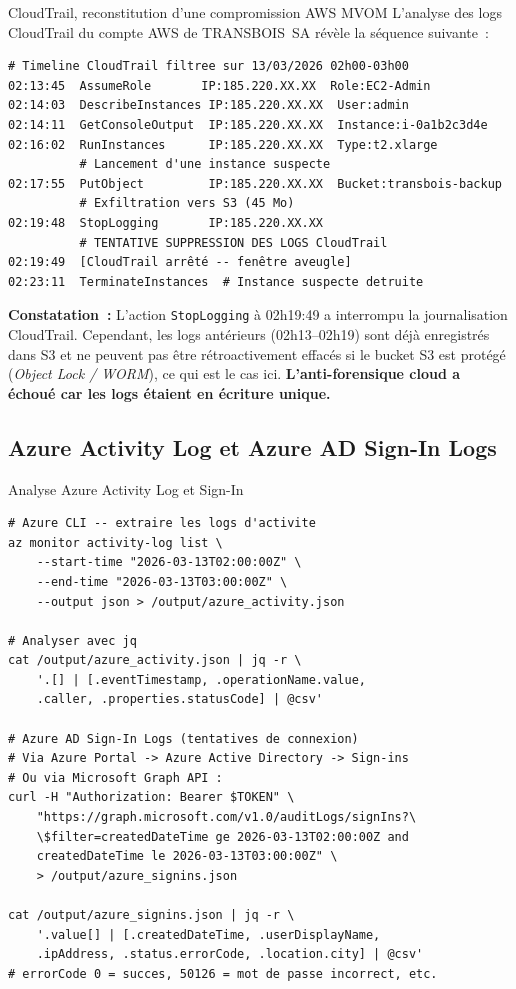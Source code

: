 \begin{boxscenario}{CloudTrail, reconstitution d'une compromission AWS MVOM}
L'analyse des logs CloudTrail du compte AWS de TRANSBOIS~SA révèle
la séquence suivante~:

\begin{lstlisting}[language=bash_forensique]
# Timeline CloudTrail filtree sur 13/03/2026 02h00-03h00
02:13:45  AssumeRole       IP:185.220.XX.XX  Role:EC2-Admin
02:14:03  DescribeInstances IP:185.220.XX.XX  User:admin
02:14:11  GetConsoleOutput  IP:185.220.XX.XX  Instance:i-0a1b2c3d4e
02:16:02  RunInstances      IP:185.220.XX.XX  Type:t2.xlarge
          # Lancement d'une instance suspecte
02:17:55  PutObject         IP:185.220.XX.XX  Bucket:transbois-backup
          # Exfiltration vers S3 (45 Mo)
02:19:48  StopLogging       IP:185.220.XX.XX
          # TENTATIVE SUPPRESSION DES LOGS CloudTrail
02:19:49  [CloudTrail arrêté -- fenêtre aveugle]
02:23:11  TerminateInstances  # Instance suspecte detruite
\end{lstlisting}

\textbf{Constatation~:} L'action \texttt{StopLogging} à 02h19:49 a
interrompu la journalisation CloudTrail. Cependant, les logs antérieurs
(02h13--02h19) sont déjà enregistrés dans S3 et ne peuvent pas être
rétroactivement effacés si le bucket S3 est protégé
(\textit{Object Lock / WORM}), ce qui est le cas ici.
\textbf{L'anti-forensique cloud a échoué car les logs étaient
en écriture unique.}
\end{boxscenario}

\subsection{Azure Activity Log et Azure AD Sign-In Logs}

\begin{boxoutils}{Analyse Azure Activity Log et Sign-In}
\begin{lstlisting}[language=bash_forensique]
# Azure CLI -- extraire les logs d'activite
az monitor activity-log list \
    --start-time "2026-03-13T02:00:00Z" \
    --end-time "2026-03-13T03:00:00Z" \
    --output json > /output/azure_activity.json

# Analyser avec jq
cat /output/azure_activity.json | jq -r \
    '.[] | [.eventTimestamp, .operationName.value,
    .caller, .properties.statusCode] | @csv'

# Azure AD Sign-In Logs (tentatives de connexion)
# Via Azure Portal -> Azure Active Directory -> Sign-ins
# Ou via Microsoft Graph API :
curl -H "Authorization: Bearer $TOKEN" \
    "https://graph.microsoft.com/v1.0/auditLogs/signIns?\
    \$filter=createdDateTime ge 2026-03-13T02:00:00Z and
    createdDateTime le 2026-03-13T03:00:00Z" \
    > /output/azure_signins.json

cat /output/azure_signins.json | jq -r \
    '.value[] | [.createdDateTime, .userDisplayName,
    .ipAddress, .status.errorCode, .location.city] | @csv'
# errorCode 0 = succes, 50126 = mot de passe incorrect, etc.
\end{lstlisting}
\end{boxoutils}

